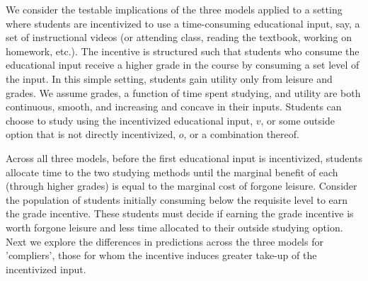 \documentclass[12pt]{article}
\begin{document}
We consider the testable implications of the three models applied to a setting where students are incentivized to use a time-consuming educational input, say, a set of instructional videos (or attending class, reading the textbook, working on homework, etc.). The incentive is structured such that students who consume the educational input receive a higher grade in the course by consuming a set level of the input. In this simple setting, students gain utility only from leisure and grades. We assume grades, a function of time spent studying, and utility are both continuous, smooth, and increasing and concave in their inputs. Students can choose to study using the incentivized educational input, $v$, or some outside option that is not directly incentivized, $o$, or a combination thereof.

Across all three models, before the first educational input is incentivized, students allocate time to the two studying methods until the marginal benefit of each (through higher grades) is equal to the marginal cost of forgone leisure. Consider the population of students initially consuming below the requisite level to earn the grade incentive. These students must decide if earning the grade incentive is worth forgone leisure and less time allocated to their outside studying option. Next we explore the differences in predictions across the three models for 'compliers', those for whom the incentive induces greater take-up of the incentivized input.  

\end{document}
